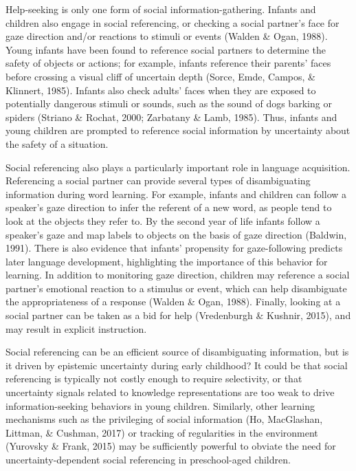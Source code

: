 \documentclass[a4paper,man,apacite,floatsintext]{apa6}
\begin{document}
Help-seeking is only one form of social information-gathering. Infants
and children also engage in social referencing, or checking a social
partner's face for gaze direction and/or reactions to stimuli or events
(Walden \& Ogan, 1988). Young infants have been found to reference
social partners to determine the safety of objects or actions; for
example, infants reference their parents' faces before crossing a visual
cliff of uncertain depth (Sorce, Emde, Campos, \& Klinnert, 1985).
Infants also check adults' faces when they are exposed to potentially
dangerous stimuli or sounds, such as the sound of dogs barking or
spiders (Striano \& Rochat, 2000; Zarbatany \& Lamb, 1985). Thus,
infants and young children are prompted to reference social information
by uncertainty about the safety of a situation.

Social referencing also plays a particularly important role in language
acquisition. Referencing a social partner can provide several types of
disambiguating information during word learning. For example, infants
and children can follow a speaker's gaze direction to infer the referent
of a new word, as people tend to look at the objects they refer to. By
the second year of life infants follow a speaker's gaze and map labels
to objects on the basis of gaze direction (Baldwin, 1991). There is also
evidence that infants' propensity for gaze-following predicts later
language development, highlighting the importance of this behavior for
learning. In addition to monitoring gaze direction, children may
reference a social partner's emotional reaction to a stimulus or event,
which can help disambiguate the appropriateness of a response (Walden \&
Ogan, 1988). Finally, looking at a social partner can be taken as a bid
for help (Vredenburgh \& Kushnir, 2015), and may result in explicit
instruction.

Social referencing can be an efficient source of disambiguating
information, but is it driven by epistemic uncertainty during early
childhood? It could be that social referencing is typically not costly
enough to require selectivity, or that uncertainty signals related to
knowledge representations are too weak to drive information-seeking
behaviors in young children. Similarly, other learning mechanisms such
as the privileging of social information (Ho, MacGlashan, Littman, \&
Cushman, 2017) or tracking of regularities in the environment (Yurovsky
\& Frank, 2015) may be sufficiently powerful to obviate the need for
uncertainty-dependent social referencing in preschool-aged children.
\end{document}
